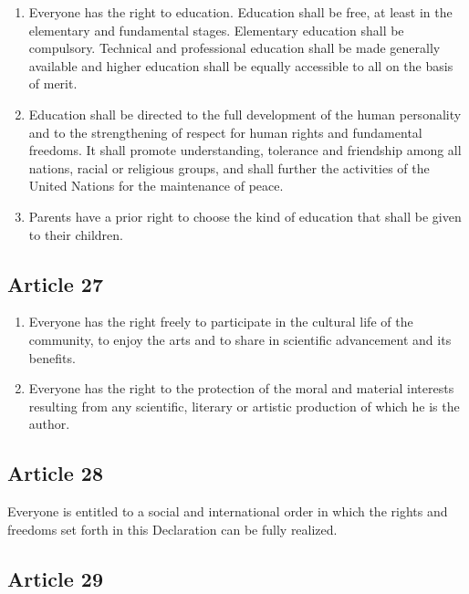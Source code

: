\documentclass[
  ngerman,
  american,
  titlepage,
  openright,
  DIV=calc,
  toc=listof,
  listof=nochaptergap]{scrbook}
\begin{document}
\begin{enumerate}
\def\labelenumi{\arabic{enumi}.}
\item
  Everyone has the right to education. Education shall be free, at least
  in the elementary and fundamental stages. Elementary education shall
  be compulsory. Technical and professional education shall be made
  generally available and higher education shall be equally accessible
  to all on the basis of merit.
\item
  Education shall be directed to the full development of the human
  personality and to the strengthening of respect for human rights and
  fundamental freedoms. It shall promote understanding, tolerance and
  friendship among all nations, racial or religious groups, and shall
  further the activities of the United Nations for the maintenance of
  peace.
\item
  Parents have a prior right to choose the kind of education that shall
  be given to their children.
\end{enumerate}

\subsection{Article 27}\label{article-27-2}

\begin{enumerate}
\def\labelenumi{\arabic{enumi}.}
\item
  Everyone has the right freely to participate in the cultural life of
  the community, to enjoy the arts and to share in scientific
  advancement and its benefits.
\item
  Everyone has the right to the protection of the moral and material
  interests resulting from any scientific, literary or artistic
  production of which he is the author.
\end{enumerate}

\subsection{Article 28}\label{article-28-2}

Everyone is entitled to a social and international order in which the
rights and freedoms set forth in this Declaration can be fully realized.

\subsection{Article 29}\label{article-29-2}
\end{document}
